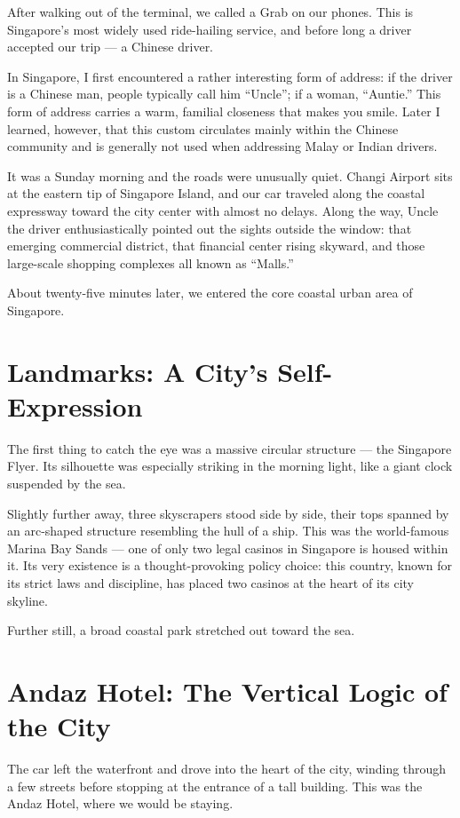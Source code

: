 After walking out of the terminal, we called a Grab on our phones. This is Singapore's most widely used ride-hailing service, and before long a driver accepted our trip --- a Chinese driver.

In Singapore, I first encountered a rather interesting form of address: if the driver is a Chinese man, people typically call him ``Uncle''; if a woman, ``Auntie.'' This form of address carries a warm, familial closeness that makes you smile. Later I learned, however, that this custom circulates mainly within the Chinese community and is generally not used when addressing Malay or Indian drivers.

It was a Sunday morning and the roads were unusually quiet. Changi Airport sits at the eastern tip of Singapore Island, and our car traveled along the coastal expressway toward the city center with almost no delays. Along the way, Uncle the driver enthusiastically pointed out the sights outside the window: that emerging commercial district, that financial center rising skyward, and those large-scale shopping complexes all known as ``Malls.''

About twenty-five minutes later, we entered the core coastal urban area of Singapore.

\section{Landmarks: A City's Self-Expression}

The first thing to catch the eye was a massive circular structure --- the Singapore Flyer. Its silhouette was especially striking in the morning light, like a giant clock suspended by the sea.

Slightly further away, three skyscrapers stood side by side, their tops spanned by an arc-shaped structure resembling the hull of a ship. This was the world-famous Marina Bay Sands --- one of only two legal casinos in Singapore is housed within it. Its very existence is a thought-provoking policy choice: this country, known for its strict laws and discipline, has placed two casinos at the heart of its city skyline.

Further still, a broad coastal park stretched out toward the sea.

\section{Andaz Hotel: The Vertical Logic of the City}

The car left the waterfront and drove into the heart of the city, winding through a few streets before stopping at the entrance of a tall building. This was the Andaz Hotel, where we would be staying.

